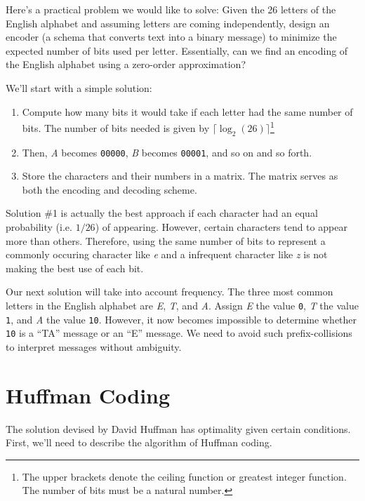 \documentclass[13pt,oneside]{tufte-book}
\providecommand{\tightlist}{%
  \setlength{\itemsep}{0pt}\setlength{\parskip}{0pt}}
\theoremstyle{definition}
\theoremstyle{definition}
\theoremstyle{definition}
\theoremstyle{remark}
\begin{document}
Here's a practical problem we would like to solve: Given the 26 letters
of the English alphabet and assuming letters are coming independently,
design an encoder (a schema that converts text into a binary message) to
minimize the expected number of bits used per letter. Essentially, can
we find an encoding of the English alphabet using a zero-order
approximation?

We'll start with a simple solution:

\begin{enumerate}
\def\labelenumi{\arabic{enumi}.}
\tightlist
\item
  Compute how many bits it would take if each letter had the same number
  of bits. The number of bits needed is given by
  \(\lceil \log_2(26)\rceil\)\footnote{The upper brackets denote the
    ceiling function or greatest integer function. The number of bits
    must be a natural number.}
\item
  Then, \emph{A} becomes \texttt{00000}, \emph{B} becomes
  \texttt{00001}, and so on and so forth.
\item
  Store the characters and their numbers in a matrix. The matrix serves
  as both the encoding and decoding scheme.
\end{enumerate}

Solution \#1 is actually the best approach if each character had an
equal probability (i.e. \(1/26\)) of appearing. However, certain
characters tend to appear more than others. Therefore, using the same
number of bits to represent a commonly occuring character like \emph{e}
and a infrequent character like \emph{z} is not making the best use of
each bit.

Our next solution will take into account frequency. The three most
common letters in the English alphabet are \emph{E}, \emph{T}, and
\emph{A}. Assign \emph{E} the value \texttt{0}, \emph{T} the value
\texttt{1}, and \emph{A} the value \texttt{10}. However, it now becomes
impossible to determine whether \texttt{10} is a ``TA'' message or an
``E'' message. We need to avoid such prefix-collisions to interpret
messages without ambiguity.

\section{Huffman Coding}\label{huffman-coding}

The solution devised by David Huffman has optimality given certain
conditions. First, we'll need to describe the algorithm of Huffman
coding.
\end{document}
